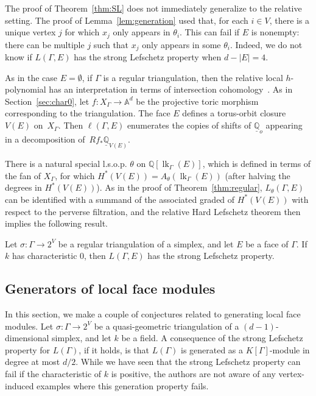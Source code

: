 The proof of Theorem~\ref{thm:SL} does not immediately generalize to the relative setting. The proof of Lemma~\ref{lem:generation} used that, for each $i \in V$, there is a unique vertex $j$ for which $x_j$ only appears in $\theta_i$. This can fail if $E$ is nonempty: there can be multiple $j$ such that $x_j$ only appears in some $\theta_i$. Indeed, we do not know if $L(\Gamma, E)$ has the strong Lefschetz property when $d - |E| = 4$. 

As in the case $E = \emptyset$, if $\Gamma$ is a regular triangulation, then the relative local $h$-polynomial has an interpretation in terms of intersection cohomology~\cite[Theorem 6.1]{KatzStapledon16}. As in Section~\ref{sec:char0}, let $f \colon X_{\Gamma} \to \mathbb{A}^d$ be the projective toric morphism corresponding to the triangulation. The face $E$ defines a torus-orbit closure $V(E)$ on~$X_{\Gamma}$. Then $\ell(\Gamma, E)$ enumerates the copies of shifts of $\underline{\mathbb{Q}}_{o}$ appearing in a decomposition of~$Rf_* \underline{\mathbb{Q}}_{V(E)}$. 

There is a natural special l.s.o.p. $\theta$ on $\mathbb{Q}[\operatorname{lk}_{\Gamma}(E)]$, which is defined in terms of the fan of $X_{\Gamma}$, for which $H^*(V(E)) = A_{\theta}(\operatorname{lk}_{\Gamma}(E))$ (after halving the degrees in $H^*(V(E))$). As in the proof of Theorem~\ref{thm:regular}, $L_{\theta}(\Gamma, E)$ can be identified with a summand of the associated graded of $H^*(V(E))$ with respect to the perverse filtration, and the relative Hard Lefschetz theorem then implies the following result. 


\begin{theo}
Let $\sigma \colon \Gamma \to 2^V$ be a regular triangulation of a simplex, and let $E$ be a face of $\Gamma$. If $k$ has characteristic $0$, then $L(\Gamma, E)$ has the strong Lefschetz property. 
\end{theo}


\subsection{Generators of local face modules}\label{ssec:generation}

In this section, we make a couple of conjectures related to generating local face modules. 
Let $\sigma \colon \Gamma \to 2^V$ be a quasi-geometric triangulation of a $(d-1)$-dimensional simplex, and let $k$ be a field. 
A consequence of the strong Lefschetz property for $L(\Gamma)$, if it holds, is that $L(\Gamma)$ is generated as a $K[\Gamma]$-module in degree at most $d/2$. While we have seen that the strong Lefschetz property can fail if the characteristic of $k$ is positive, the authors are not aware of any vertex-induced examples where this generation property fails. 

